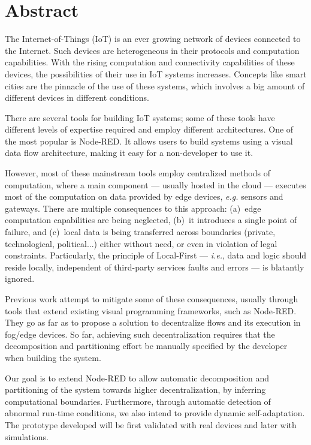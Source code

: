 \chapter*{Abstract}

The Internet-of-Things (IoT) is an ever growing network of devices connected to the Internet. Such devices are heterogeneous in their protocols and computation capabilities. With the rising computation and connectivity capabilities of these devices, the possibilities of their use in IoT systems increases. Concepts like smart cities are the pinnacle of the use of these systems, which involves a big amount of different devices in different conditions.

There are several tools for building IoT systems; some of these tools have different levels of expertise required and employ different architectures. One of the most popular is Node-RED. It allows users to build systems using a visual data flow architecture, making it easy for a non-developer to use it.

However, most of these mainstream tools employ centralized methods of computation, where a main component --- usually hosted in the cloud --- executes most of the computation on data provided by edge devices, \emph{e.g.} sensors and gateways. There are multiple consequences to this approach: (a)~edge computation capabilities are being neglected, (b)~it introduces a single point of failure, and (c)~local data is being transferred across boundaries (private, technological, political...) either without need, or even in violation of legal constraints. Particularly, the principle of Local-First --- \emph{i.e.}, data and logic should reside locally, independent of third-party services faults and errors --- is blatantly ignored.

Previous work attempt to mitigate some of these consequences, usually through tools that extend existing visual programming frameworks, such as Node-RED. They go as far as to propose a solution to decentralize flows and its execution in fog/edge devices. So far, achieving such decentralization requires that the decomposition and partitioning effort be manually specified by the developer when building the system.

Our goal is to extend Node-RED to allow automatic decomposition and partitioning of the system towards higher decentralization, by inferring computational boundaries. Furthermore, through automatic detection of abnormal run-time conditions, we also intend to provide dynamic self-adaptation. The prototype developed will be first validated with real devices and later with simulations.

